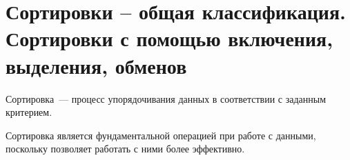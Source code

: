 \section{Сортировки – общая классификация. Сортировки с помощью включения, выделения, обменов}
Сортировка~--- процесс упорядочивания данных в соответствии с заданным критерием.

Сортировка является фундаментальной операцией при работе с данными, поскольку позволяет работать с ними более
эффективно.

